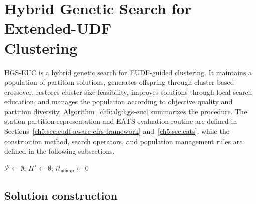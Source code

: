 \section[Hybrid Genetic Search for Extended-UDF Clustering]{Hybrid Genetic Search for Extended-UDF\\ Clustering}\label{ch5:sec:hgs-euc}

HGS-EUC is a hybrid genetic search for EUDF-guided clustering. It maintains a
population of partition solutions, generates offspring through cluster-based
crossover, restores cluster-size feasibility, improves solutions through local
search education, and manages the population according to objective quality and
partition diversity. Algorithm~\ref{ch5:alg:hgs-euc} summarizes the procedure. The
station partition representation and EATS evaluation routine are defined in
Sections~\ref{ch5:sec:eudf-aware-cfrs-framework} and~\ref{ch5:sec:eats},
while the construction method, search operators, and population management rules
are defined in the following subsections.

\begin{algorithm}[htbp]
\caption{HGS-EUC partition search}
\label{ch5:alg:hgs-euc}
$\mathcal P\gets\emptyset$; $\Pi^\star\gets\emptyset$; $it_{\mathrm{noimp}}\gets 0$\;
\Return{$\Pi^\star$}\;
\end{algorithm}

\subsection{Solution construction}\label{ch5:sec:hgs-euc-construction}

